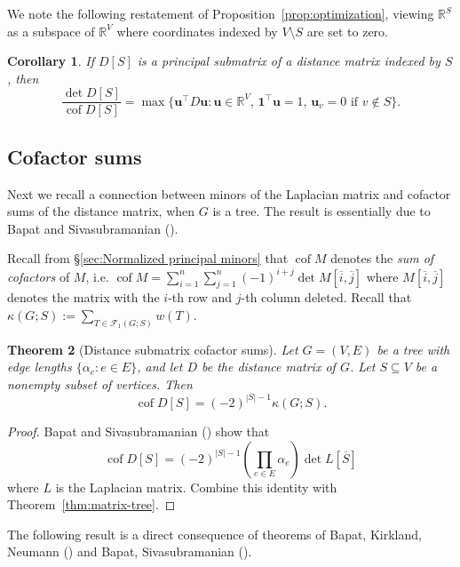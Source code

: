 \documentclass[12pt]{amsart}
\newtheorem{thm}{Theorem}[section]
\newtheorem{cor}[thm]{Corollary}
\theoremstyle{definition}
\newcommand{\RR}{\mathbb{R}}
\newcommand{\bone}{\mathbf{1}}
\newcommand{\boldu}{\mathbf{u}}
\newcommand{\Da}{{D}}
\newcommand{\La}{L}
\newcommand{\tr}{\intercal}
\DeclareMathOperator{\cof}{cof}
\newcommand{\trees}{\mathcal{F}_1}
\begin{document}
We note the following restatement of Proposition~\ref{prop:optimization}, viewing $\RR^S$ as a subspace of $\RR^V$ 
where coordinates indexed by $V \setminus S$ are set to zero.
\begin{cor}
\label{cor:optimization}
If $D[S]$ is a principal submatrix of a distance matrix indexed by $S$, then 
\[
	\frac{\det D[S]}{\cof D[S]} = \max \{\boldu^\tr D \boldu \colon \boldu \in \RR^V,\, \bone^\tr \boldu = 1,\, \boldu_v = 0 \text{ if } v \not\in S \}.
\]
\end{cor}



\subsection{Cofactor sums}

Next we recall a connection between minors of the Laplacian matrix and cofactor sums of the distance matrix, when $G$ is a tree.
The result is essentially due to Bapat and Sivasubramanian (\cite{bapat-sivasubramanian}).

Recall from \S\ref{sec:Normalized principal minors} that $\cof M$ denotes the {\em sum of cofactors} of $M$, i.e. 
$\displaystyle
	\cof M = \sum_{i = 1}^{n} \sum_{j = 1}^{n} (-1)^{i + j} \det M[\overline{i}, \overline{j}]
$
where $M[\overline{i}, \overline{j}]$ denotes the matrix with the $i$-th row and $j$-th column deleted.
Recall that $\kappa(G; S)  :=  \sum_{T \in \trees(G; S)} w(T)$.

\begin{thm}[Distance submatrix cofactor sums]
\label{thm:distance-sub-cof}
Let $G = (V, E)$ be a tree with edge lengths $\{\alpha_e \colon e \in E\}$,
and let $\Da$ be the distance matrix of $G$.
Let $S \subseteq V$ be a nonempty subset of vertices. 
Then
\begin{equation}
	\cof \Da[S] = (-2)^{|S| - 1} \kappa(G; S) .
\end{equation}
\end{thm}
\begin{proof}
Bapat and Sivasubramanian (\cite[Theorem 11]{bapat-sivasubramanian})
show that
\[
	\cof \Da[S] = (-2)^{|S|-1} \left( \prod_{e \in E} \alpha_e \right) \det \La[\overline S] 
\]
where $\La$ is the Laplacian matrix.
Combine this identity with Theorem~\ref{thm:matrix-tree}.
\end{proof}

The following result is a direct consequence of theorems of Bapat, Kirkland, Neumann (\cite{bapat-kirkland-neumann}) and Bapat, Sivasubramanian (\cite{bapat-sivasubramanian}).
\end{document}
